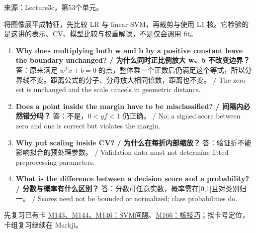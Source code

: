 来源：Lecture3c，第53个单元。





 将图像展平成特征，先比较 LR 与 linear SVM，再裁剪与使用 L1 核。它检验的是这讲的表示、CV、模型比较与权重解读，不是仅会调用 fit。



\begin{enumerate}[start=1]

\item \textbf{Why does multiplying both w and b by a positive constant leave the boundary unchanged? / 为什么同时正比例放大 w、b 不改变边界？} 答：原来满足 \(w^Tx+b=0\) 的点，整体乘一个正数后仍满足这个等式，所以分界线不变。距离公式的分子、分母放大相同倍数，距离也不变。 / The zero set is unchanged and the scale cancels in geometric distance.

\item \textbf{Does a point inside the margin have to be misclassified? / 间隔内必然错分吗？} 答：不是，\(0\lt yf\lt 1\) 仍正确。 / No; a signed score between zero and one is correct but violates the margin.

\item \textbf{Why put scaling inside CV? / 为什么在每折内部缩放？} 答：验证折不能影响拟合的预处理参数。 / Validation data must not determine fitted preprocessing parameters.

\item \textbf{What is the difference between a decision score and a probability? / 分数与概率有什么区别？} 答：分数可任意实数，概率需在[0,1]且对类别归一。 / Scores need not be bounded or normalized; class probabilities do.

\end{enumerate}


先复习已有卡 \href{https://crazyshout.github.io/micro-course/cards.html\#CS5489-M143}{M143、M144、M146：SVM间隔}、\href{https://crazyshout.github.io/micro-course/cards.html\#CS5489-M166}{M166：核技巧}；按卡号定位，卡组复习继续在 Markji。




